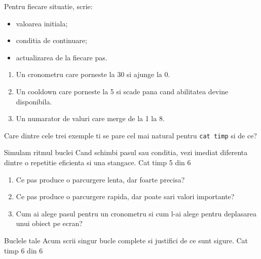 \begin{guidebox}
Pentru fiecare situatie, scrie:
\begin{itemize}
\item valoarea initiala;
\item conditia de continuare;
\item actualizarea de la fiecare pas.
\end{itemize}

\begin{enumerate}
\item Un cronometru care porneste la 30 si ajunge la 0.
\item Un cooldown care porneste la 5 si scade pana cand abilitatea devine disponibila.
\item Un numarator de valuri care merge de la 1 la 8.
\end{enumerate}
\end{guidebox}

\begin{semibox}
Care dintre cele trei exemple ti se pare cel mai natural pentru \texttt{cat timp} si de ce?
\end{semibox}

\clearpage

\PageHeader
  {Simulam ritmul buclei}
  {Cand schimbi pasul sau conditia, vezi imediat diferenta dintre o repetitie eficienta si una stangace.}
  {Cat timp 5 din 6}


\begin{semibox}
\begin{enumerate}
\item Ce pas produce o parcurgere lenta, dar foarte precisa?
\item Ce pas produce o parcurgere rapida, dar poate sari valori importante?
\item Cum ai alege pasul pentru un cronometru si cum l-ai alege pentru deplasarea unui obiect pe ecran?
\end{enumerate}
\end{semibox}

\clearpage

\PageHeader
  {Buclele tale}
  {Acum scrii singur bucle complete si justifici de ce sunt sigure.}
  {Cat timp 6 din 6}

